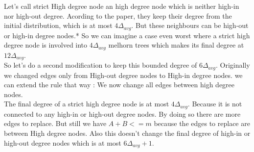 \documentclass{article}
\begin{document}
Let's call strict High degree node an high degree node which is neither
high-in nor high-out degree. Acording to the paper, they keep their
degree from the initial distribution, which is at most $4\Delta_{avg}$.
But these neighbours can be high-out or high-in degree nodes.*
So we can imagine a case even worst where a strict high degree node
is involved into $4\Delta_{avg}$ melhorn trees which makes its
final degree at $12\Delta_{avg}$.\\

So let's do a second modification to keep this bounded degree of $6\Delta_{avg}$.
Originally we changed edges only from High-out degree nodes
to High-in degree nodes. we can extend the rule that way :
We now change all edges between high degree nodes.\\

The final degree of a strict high degree node is at most $4\Delta_{avg}$.
Because it is not connected to any high-in or high-out degree nodes.
By doing so there are more edges to replace.
But still we have $ A + B <= m$
because the edges to replace are between High degree nodes.
Also this doesn't change the final degree of high-in or
high-out degree nodes which is at most $6\Delta_{avg} + 1$.
\end{document}
